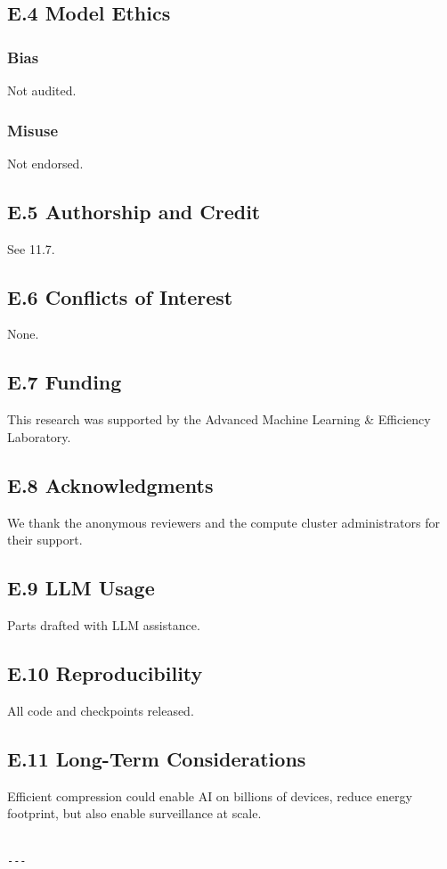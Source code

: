 \subsection{E.4 Model Ethics}

\subsubsection{Bias}
Not audited.

\subsubsection{Misuse}
Not endorsed.

\subsection{E.5 Authorship and Credit}
See  11.7.

\subsection{E.6 Conflicts of Interest}
None.

\subsection{E.7 Funding}
This research was supported by the Advanced Machine Learning \& Efficiency Laboratory.

\subsection{E.8 Acknowledgments}
We thank the anonymous reviewers and the compute cluster administrators for their support.

\subsection{E.9 LLM Usage}
Parts drafted with LLM assistance.

\subsection{E.10 Reproducibility}
All code and checkpoints released.

\subsection{E.11 Long-Term Considerations}
Efficient compression could enable AI on billions of devices, reduce energy 
footprint, but also enable surveillance at scale.
\begin{lstlisting}

---
\end{lstlisting}
